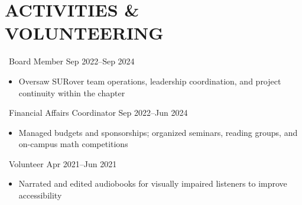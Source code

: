 \section*{ACTIVITIES \& VOLUNTEERING}

\textbf{} \textbar\ Board Member \hfill Sep 2022--Sep 2024
\begin{itemize}
  \item Oversaw SURover team operations, leadership coordination, and project continuity within the chapter
\end{itemize}
\entrysep

\textbf{} \textbar\ Financial Affairs Coordinator \hfill Sep 2022--Jun 2024
\begin{itemize}
  \item Managed budgets and sponsorships; organized seminars, reading groups, and on-campus math competitions
\end{itemize}
\entrysep

\textbf{} \textbar\ Volunteer \hfill Apr 2021--Jun 2021
\begin{itemize}
  \item Narrated and edited audiobooks for visually impaired listeners to improve accessibility
\end{itemize}
